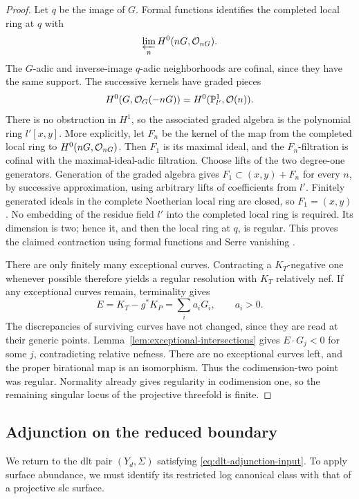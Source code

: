 \begin{proof}
Let \(q\) be the image of \(G\).  Formal functions identifies the completed
local ring at \(q\) with
\[
 \varprojlim_n H^0(nG,\mathcal O_{nG}).
\]
The \(G\)-adic and inverse-image \(q\)-adic neighborhoods are cofinal,
since they have the same support.  The successive kernels have graded
pieces
\[
 H^0(G,\mathcal O_G(-nG))=H^0(\mathbb P^1_{l'},\mathcal O(n)).
\]
There is no obstruction in \(H^1\), so the associated graded algebra is
the polynomial ring \(l'[x,y]\).
More explicitly, let \(F_n\) be the kernel of the map from the completed
local ring to \(H^0(nG,\mathcal O_{nG})\).  Then \(F_1\) is its maximal ideal,
and the \(F_n\)-filtration is cofinal with the maximal-ideal-adic filtration.
Choose lifts of the two degree-one generators.
Generation of the graded algebra gives
\(F_1\subset(x,y)+F_n\) for every \(n\), by successive approximation,
using arbitrary lifts of coefficients from \(l'\).
Finitely generated ideals in the complete Noetherian local ring are
closed, so \(F_1=(x,y)\).  No embedding of the residue field \(l'\) into
the completed local ring is required.
Its dimension is two; hence
it, and then the local ring at \(q\), is regular.  This proves the claimed
contraction using formal functions and Serre vanishing
\cite[III, Sections~5 and~11]{hartshorne1977}.

There are only finitely many exceptional curves.  Contracting a
\(K_T\)-negative one whenever possible therefore yields a regular
resolution with \(K_T\) relatively nef.  If any exceptional curves remain,
terminality gives
\[
 E=K_T-g^*K_P=\sum_i a_iG_i,\qquad a_i>0.
\]
The discrepancies of surviving curves have not changed, since they are
read at their generic points.  Lemma~\ref{lem:exceptional-intersections}
gives \(E\cdot G_j<0\) for some \(j\), contradicting relative nefness.
There are no exceptional curves left, and the proper birational map is
an isomorphism.  Thus the codimension-two point was regular.
Normality already gives regularity in codimension one, so the remaining
singular locus of the projective threefold is finite.
\end{proof}

\subsection{Adjunction on the reduced boundary}

We return to the dlt pair \((Y_d,\Sigma)\) satisfying
\eqref{eq:dlt-adjunction-input}.  To apply surface abundance, we must
identify its restricted log canonical class with that of a projective
slc surface.

